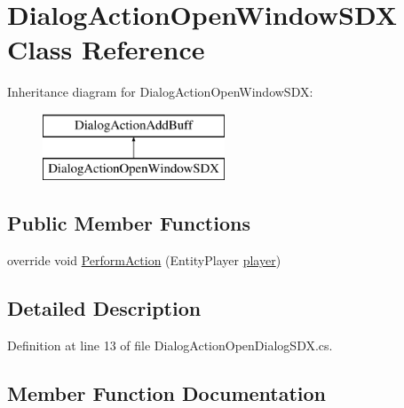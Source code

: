 \hypertarget{class_dialog_action_open_window_s_d_x}{}\section{Dialog\+Action\+Open\+Window\+S\+DX Class Reference}
\label{class_dialog_action_open_window_s_d_x}
Inheritance diagram for Dialog\+Action\+Open\+Window\+S\+DX\+:\begin{figure}[H]
\begin{center}
\leavevmode
\includegraphics[height=2.000000cm]{class_dialog_action_open_window_s_d_x}
\end{center}
\end{figure}
\subsection*{Public Member Functions}
\begin{DoxyCompactItemize}
\item 
override void \mbox{\hyperlink{class_dialog_action_open_window_s_d_x_a2112561f34bb76575e650aaf3100325f}{Perform\+Action}} (Entity\+Player \mbox{\hyperlink{_sphere_i_i_01_music_01_boxes_2_config_2_localization_8txt_a4e2cb8aeff651600ea1cc57fe5a929a4}{player}})
\end{DoxyCompactItemize}


\subsection{Detailed Description}


Definition at line 13 of file Dialog\+Action\+Open\+Dialog\+S\+D\+X.\+cs.



\subsection{Member Function Documentation}
\mbox{\label{class_dialog_action_open_window_s_d_x_a2112561f34bb76575e650aaf3100325f}} 
